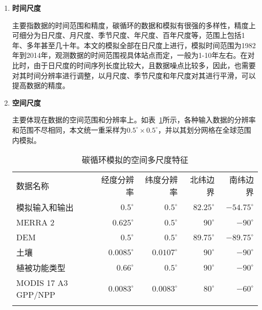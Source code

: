 \begin{enumerate}[(1)]
    \item \textbf{时间尺度}
    
    主要指数据的时间范围和精度，碳循环的数据和模拟有很强的多样性，精度上可细分为日尺度、月尺度、季节尺度、年尺度、百年尺度等，范围上包括1年、多年甚至几十年。本文的模拟全部在日尺度上进行，模拟时间范围为1982年到2014年，观测数据的时间范围视具体站点而定，一般为1-10年左右。在对比时，由于日尺度的时间序列长度比较大，且数据噪点比较多，因此，也需要对其时间分辨率进行调整，以月尺度、季节尺度和年尺度对其进行平滑，可以提高数据的精度。

    \item \textbf{空间尺度}
    
    主要体现在数据的空间范围和分辨率上。如表~\ref{tab:spatial-multi-resulotion}所示，各种输入数据的分辨率和范围不尽相同，本文统一重采样为$0.5^{\circ} \times 0.5^{\circ}$，并以其划分网格在全球范围内模拟。

    \begin{table}[H]
        \centering
        \caption{碳循环模拟的空间多尺度特征}
        \label{tab:spatial-multi-resulotion}
        \begin{threeparttable}
            \begin{tabular}{lrrrr}
                \Xhline{1.5pt}
                数据名称 & 经度分辨率 & 纬度分辨率 & 北纬边界 & 南纬边界 \\
                \Xhline{1.5pt}
                模拟输入和输出 & $0.5^\circ$ & $0.5^\circ$ & $82.25^\circ$ & $-54.75^\circ$ \\
                MERRA 2 & $0.625^\circ$ & $0.5^\circ$ & $90^\circ$ & $-90^\circ$ \\
                DEM & $0.5^\circ$ & $0.5^\circ$ & $89.75^\circ$ & $-89.75^\circ$ \\
                土壤 & $0.0085^\circ$ & $0.0107^\circ$ & $90^\circ$ & $-90^\circ$ \\
                植被功能类型 & $0.66^\circ$ & $0.5^\circ$ & $90^\circ$ & $-90^\circ$ \\
                MODIS 17 A3 GPP/NPP & $0.0083^\circ$ & $0.0083^\circ$ & $80^\circ$ & $-60^\circ$ \\
                \Xhline{1.5pt}
            \end{tabular}
        \end{threeparttable}
    \end{table}

\end{enumerate}

